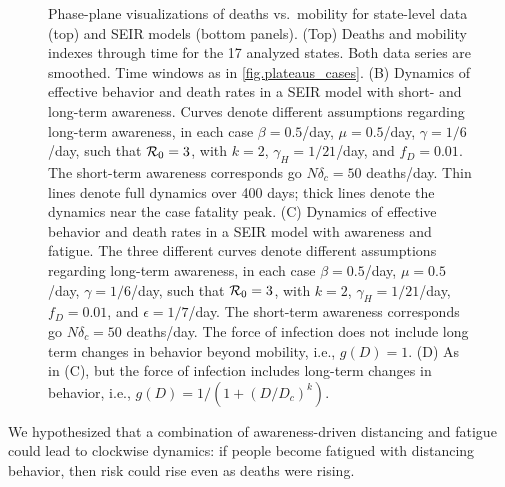 \begin{figure}
\begin{center}
\caption{Phase-plane visualizations of deaths vs.~mobility for state-level
data (top) and SEIR models (bottom panels).
(Top) Deaths and mobility indexes through time for the 17 analyzed states. Both data series are smoothed. 
Time windows as in \ref{fig.plateaus_cases}.
(B)
Dynamics of effective behavior and death rates
in a SEIR model with short- and long-term awareness. 
Curves denote different assumptions regarding long-term awareness,
in each case $\beta=0.5$/day, $\mu=0.5$/day, $\gamma=1/6$/day, such that ${\cal{R}}_0=3$,
with $k=2$, $\gamma_H=1/21$/day, and $f_D=0.01$.  The short-term awareness
corresponds go $N\delta_c=50$ deaths/day. Thin lines denote
full dynamics over 400 days; thick lines denote the dynamics
near the case fatality peak.
(C) Dynamics of effective behavior and death rates
in a SEIR model with awareness and fatigue. The three
different curves denote different assumptions regarding long-term awareness,
in each case $\beta=0.5$/day, $\mu=0.5$/day, $\gamma=1/6$/day, such that ${\cal{R}}_0=3$,
with $k=2$, $\gamma_H=1/21$/day, $f_D=0.01$, and $\epsilon=1/7$/day.  
The short-term awareness
corresponds go $N\delta_c=50$ deaths/day. 
The force of infection does not include long term changes in behavior
beyond mobility, i.e., $g(D)=1$.
(D) As in (C), but the force
of infection includes long-term changes in behavior, i.e., 
$g(D)=1/\left(1+(D/D_c)^k\right)$.
\label{fig.phase_real_theory}}
\end{center}
\end{figure}

We hypothesized that
a combination of awareness-driven distancing and fatigue
could lead to clockwise dynamics: if people become fatigued with distancing behavior, then risk could rise even as deaths were rising.

